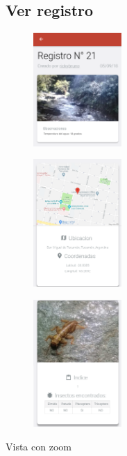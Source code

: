 \begin{itemize}
				\subsection{Ver registro}
					\begin{figure}
							\includegraphics[width=0.3\textwidth]{Screenshots/verRegistro1.png}
							\label{fig:verRegistro1}
					\end{figure}
					\begin{figure}
							\includegraphics[width=0.3\textwidth]{Screenshots/verRegistro2.png}
							\label{fig:verRegistro2}
					\end{figure}
					\begin{figure}
							\includegraphics[width=0.3\textwidth]{Screenshots/verRegistro3.png}
							\label{fig:verRegistro3}
					\end{figure}
					\caption{Vista con zoom}


\end{itemize}
